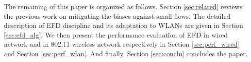 \documentclass[preprint,12pt]{elsarticle}
\begin{document}

The remaining of this paper is organized as follows. Section \ref{sec:related} reviews the previous work on mitigating the biases against small flows. The detailed description of EFD discipline and its adaptation to WLANs are given in Section \ref{sec:efd_alg}. We then present the performance evaluation of EFD in wired network and in 802.11 wireless network respectively in Section \ref{sec:perf_wired} and Section \ref{sec:perf_wlan}. And finally, Section \ref{sec:conclu} concludes the paper. 


\end{document}
